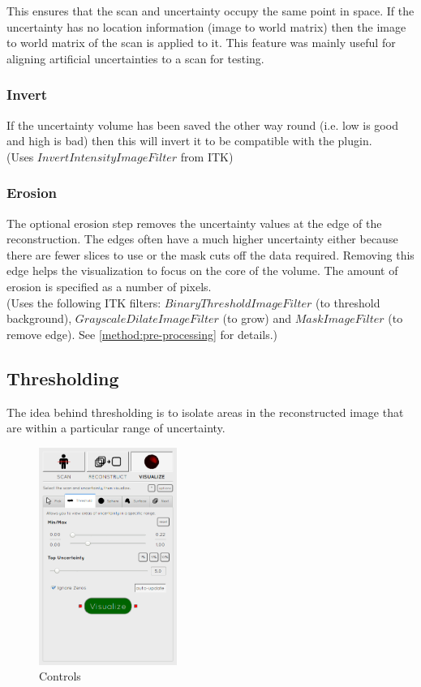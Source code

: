 This ensures that the scan and uncertainty occupy the same point in space. If the uncertainty has no location information (image to world matrix) then the image to world matrix of the scan is applied to it. This feature was mainly useful for aligning artificial uncertainties to a scan for testing.

\subsubsection*{Invert}
If the uncertainty volume has been saved the other way round (i.e. low is good and high is bad) then this will invert it to be compatible with the plugin.\\(Uses $InvertIntensityImageFilter$ from ITK)

\subsubsection*{Erosion}
The optional erosion step removes the uncertainty values at the edge of the reconstruction. The edges often have a much higher uncertainty either because there are fewer slices to use or the mask cuts off the data required. Removing this edge helps the visualization to focus on the core of the volume. The amount of erosion is specified as a number of pixels.\\(Uses the following ITK filters: $BinaryThresholdImageFilter$ (to threshold background), $GrayscaleDilateImageFilter$ (to grow) and $MaskImageFilter$ (to remove edge). See \ref{method:pre-processing} for details.)

\clearpage
\subsection{Thresholding}\label{implementation:thresholding}
The idea behind thresholding is to isolate areas in the reconstructed image that are within a particular range of uncertainty. 

\begin{figure}
  \vspace{-20pt}
  \includegraphics[width=0.4\textwidth]{images/tool/2_thresholding.png}
  \caption{Controls}\label{fig:threshold_settings}
\end{figure}

